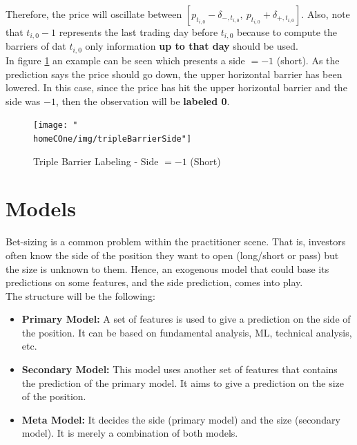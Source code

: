 \documentclass[a4paper]{article}
\newcommand{\homeCOne}{../../Chapter 1 - Metalabeling/Draft}
\begin{document}
Therefore, the price will oscillate between $[ p_{t_{i,0}} - 
\delta_{-, t_{i,0}}, \ p_{t_{i,0}} + \delta_{+, t_{i,0}} ]$. Also, 
note that $t_{i,0} - 1$ represents the last trading day before 
$t_{i,0}$ because to compute the barriers of dat $t_{i,0}$ only 
information \textbf{up to that day} should be used.\\

In figure \ref{fig:tripleBarrierSide} an example can be seen which 
presents a side $= -1$ (short). As the prediction says the price 
should go down, the upper horizontal barrier has been lowered. In this 
case, since the price has hit the upper horizontal barrier and the 
side was $-1$, then the observation will be \textbf{labeled 0}.

\begin{figure}[htbp]
	\centering
	\texttt{[image: "\\homeCOne/img/tripleBarrierSide"]}
	\caption{Triple Barrier Labeling - Side $= -1$ (Short)}
	\label{fig:tripleBarrierSide}
\end{figure}

\section{Models}
\label{sec:models}
Bet-sizing is a common problem within the practitioner scene. That is, 
investors often know the side of the position they want to open 
(long/short or pass) but the size is unknown to them. Hence, an 
exogenous model that could base its predictions on some features, and 
the side prediction, comes into play.\\

The structure will be the following:

\begin{itemize}
	\item \textbf{Primary Model:} A set of features is used to give a 
	prediction on the side of the position. It can be based on 
	fundamental analysis, ML, technical analysis, etc.
	
	\item \textbf{Secondary Model:} This model uses another set of 
	features that contains the prediction of the primary model. It 
	aims to give a prediction on the size of the position.
	
	\item \textbf{Meta Model:} It decides the side (primary model) and 
	the size (secondary model). It is merely a combination of both 
	models.
\end{itemize}
\end{document}
